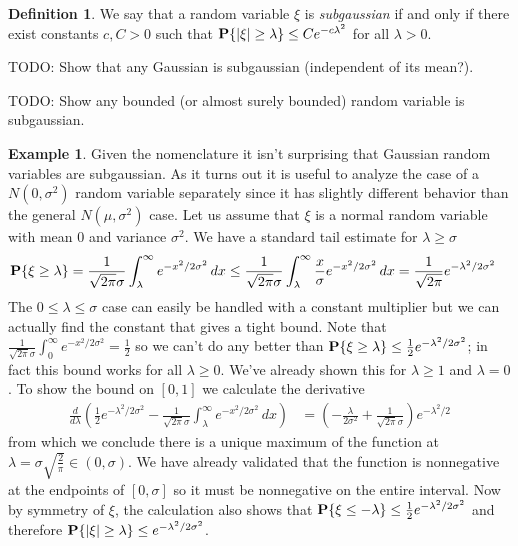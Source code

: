 \documentclass{amsart}
\theoremstyle{remark}
\theoremstyle{definition}
\newtheorem{defn}[thm]{Definition}
\newtheorem{examp}[thm]{Example}
\begin{document}
\begin{defn}
We say that a random variable $\xi$ is \emph{subgaussian} if and only if
there exist constants $c, C > 0$ such that $\textbf{P}\{ \left \vert \xi \right \vert
  \geq \lambda\} \leq C e^{-c \lambda^2}$ for all $\lambda > 0$.
\end{defn}

TODO: Show that any Gaussian is subgaussian (independent of its mean?).

TODO: Show any bounded (or almost surely bounded) random variable is
subgaussian.

\begin{examp}Given the nomenclature it isn't surprising that Gaussian
  random variables are subgaussian.  As it turns out it is useful to
  analyze the case of a $N(0,\sigma^2)$ random variable separately
  since it has slightly different behavior than the general $N(\mu,
  \sigma^2)$ case.  Let us assume that $\xi$ is a normal random
  variable with mean $0$ and variance $\sigma^2$.  We have a standard tail estimate for $\lambda \geq \sigma$
\begin{align*}
\textbf{P}\{\xi \geq \lambda\} &= 
\frac{1}{\sqrt{2\pi}\sigma} \int_\lambda^\infty e^{-x^2/2\sigma^2} \, dx \leq 
\frac{1}{\sqrt{2\pi}\sigma} \int_\lambda^\infty \frac{x}{\sigma} e^{-x^2/2\sigma^2} \, dx =
\frac{1}{\sqrt{2\pi}} e^{-\lambda^2/2\sigma^2}
\end{align*}
The $0 \leq \lambda \leq \sigma$ case can easily be handled with a constant
multiplier but we can actually find the constant that gives a tight
bound.  Note that $\frac{1}{\sqrt{2\pi}\sigma} \int_0^\infty e^{-x^2/2\sigma^2} =
\frac{1}{2}$ so we can't do any better than $\textbf{P}\{\xi \geq
  \lambda\} \leq \frac{1}{2} e^{-\lambda^2/2\sigma^2}$; in fact this bound
works for all $\lambda \geq 0$.  We've already shown this for $\lambda
\geq 1$ and $\lambda=0$.  To show the bound on $[0,1]$ we calculate
the derivative 
\begin{align*}
\frac{d}{d\lambda} \left( \frac{1}{2} e^{-\lambda^2/2\sigma^2} -
  \frac{1}{\sqrt{2\pi}\sigma} \int_\lambda^\infty e^{-x^2/2\sigma^2} \, dx \right)
&=\left( -\frac{\lambda}{2\sigma^2} + \frac{1}{\sqrt{2\pi}\sigma}\right) e^{-\lambda^2/2}
\end{align*}
from which we conclude there is a unique maximum of the function at
$\lambda=\sigma \sqrt{\frac{2}{\pi}} \in (0,\sigma)$.  We have already validated
that the function is nonnegative at the endpoints of $[0,\sigma]$ so it must
be nonnegative on the entire interval.  Now by symmetry of $\xi$, the
calculation also shows that $\textbf{P}\{\xi \leq -\lambda\} \leq
\frac{1}{2}e^{-\lambda^2/2\sigma^2}$ and therefore $\textbf{P}\{\left \vert \xi \right \vert
  \geq \lambda\} \leq e^{-\lambda^2/2\sigma^2}$.


\end{examp}
\end{document}
